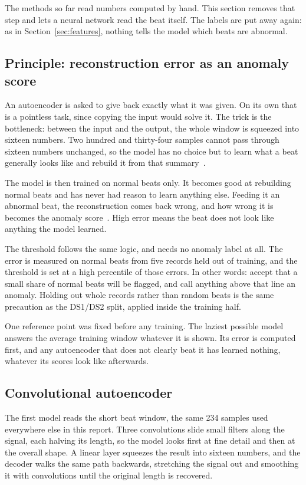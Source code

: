 \documentclass[a4paper, 12pt]{article}
\begin{document}
The methods so far read numbers computed by hand. This section removes that step
and lets a neural network read the beat itself. The labels are put away again: as
in Section~\ref{sec:features}, nothing tells the model which beats are abnormal.

\subsection{Principle: reconstruction error as an anomaly score}
\label{subsec:aeprinciple}

An autoencoder is asked to give back exactly what it was given. On its own that is
a pointless task, since copying the input would solve it. The trick is the
bottleneck: between the input and the output, the whole window is squeezed into
sixteen numbers. Two hundred and thirty-four samples cannot pass through sixteen
numbers unchanged, so the model has no choice but to learn what a beat generally
looks like and rebuild it from that summary~\cite{hinton2006reducing}.

The model is then trained on normal beats only. It becomes good at rebuilding
normal beats and has never had reason to learn anything else. Feeding it an
abnormal beat, the reconstruction comes back wrong, and how wrong it is becomes
the anomaly score~\cite{sakurada2014autoencoder}. High error means the beat does
not look like anything the model learned.

The threshold follows the same logic, and needs no anomaly label at all. The error
is measured on normal beats from five records held out of training, and the
threshold is set at a high percentile of those errors. In other words: accept that
a small share of normal beats will be flagged, and call anything above that line
an anomaly. Holding out whole records rather than random beats is the same
precaution as the DS1/DS2 split, applied inside the training half.

One reference point was fixed before any training. The laziest possible model
answers the average training window whatever it is shown. Its error is computed
first, and any autoencoder that does not clearly beat it has learned nothing,
whatever its scores look like afterwards.

\subsection{Convolutional autoencoder} \label{subsec:cnnae}

The first model reads the short beat window, the same 234 samples used everywhere
else in this report. Three convolutions slide small filters along the signal, each
halving its length, so the model looks first at fine detail and then at the
overall shape. A linear layer squeezes the result into sixteen numbers, and the
decoder walks the same path backwards, stretching the signal out and smoothing it
with convolutions until the original length is recovered.
\end{document}
